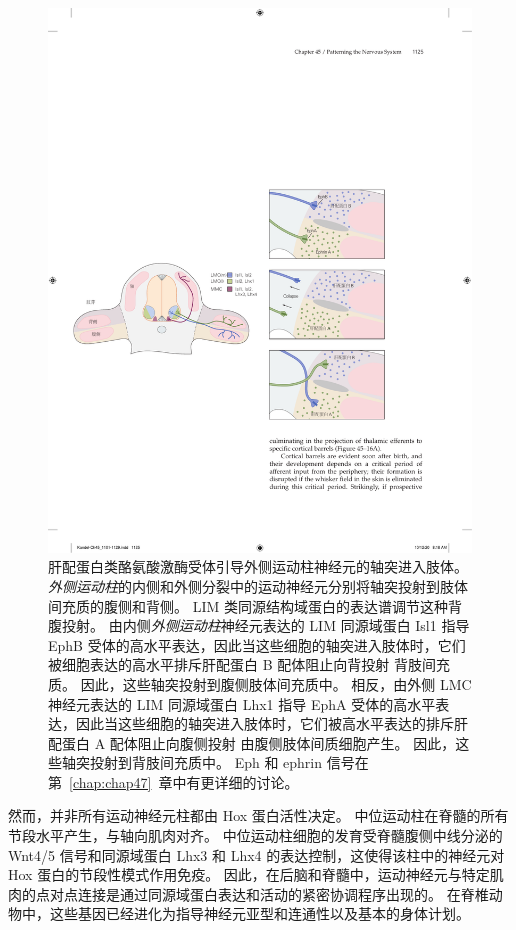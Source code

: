 \begin{figure}[htbp]
	\centering
	\includegraphics[width=1.0\linewidth]{chap45/fig_45_14}
	\caption{肝配蛋白类酪氨酸激酶受体引导外侧运动柱神经元的轴突进入肢体。
		\textit{外侧运动柱}的内侧和外侧分裂中的运动神经元分别将轴突投射到肢体间充质的腹侧和背侧。
		LIM 类同源结构域蛋白的表达谱调节这种背腹投射。 
		由内侧\textit{外侧运动柱}神经元表达的 LIM 同源域蛋白 Isl1 指导 EphB 受体的高水平表达，因此当这些细胞的轴突进入肢体时，它们被细胞表达的高水平排斥肝配蛋白 B 配体阻止向背投射 背肢间充质。
		因此，这些轴突投射到腹侧肢体间充质中。
		相反，由外侧 LMC 神经元表达的 LIM 同源域蛋白 Lhx1 指导 EphA 受体的高水平表达，因此当这些细胞的轴突进入肢体时，它们被高水平表达的排斥肝配蛋白 A 配体阻止向腹侧投射 由腹侧肢体间质细胞产生。
		因此，这些轴突投射到背肢间充质中。
		Eph 和 ephrin 信号在第~\ref{chap:chap47}~章中有更详细的讨论。}
	\label{fig:45_14}
\end{figure}


然而，并非所有运动神经元柱都由 Hox 蛋白活性决定。
中位运动柱在脊髓的所有节段水平产生，与轴向肌肉对齐。
中位运动柱细胞的发育受脊髓腹侧中线分泌的 Wnt4/5 信号和同源域蛋白 Lhx3 和 Lhx4 的表达控制，这使得该柱中的神经元对 Hox 蛋白的节段性模式作用免疫。
因此，在后脑和脊髓中，运动神经元与特定肌肉的点对点连接是通过同源域蛋白表达和活动的紧密协调程序出现的。
在脊椎动物中，这些基因已经进化为指导神经元亚型和连通性以及基本的身体计划。



